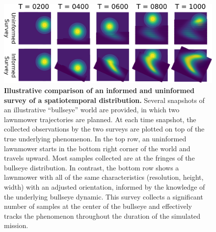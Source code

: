 \begin{figure}[h!]
  \centering
  \includegraphics[width=1\columnwidth]{figures/intro_lawn.png}
  \caption[Comparison of informed and uninformed survey of spatiotemporal distribution.]{\textbf{Illustrative comparison of an informed and uninformed survey of a spatiotemporal distribution.} Several snapshots of an illustrative ``bullseye'' world are provided, in which two lawnmower trajectories are planned. At each time snapshot, the collected observations by the two surveys are plotted on top of the true underlying phenomenon. In the top row, an uninformed lawnmower starts in the bottom right corner of the world and travels upward.  Most samples collected are at the fringes of the bullseye distribution. In contrast, the bottom row shows a lawnmower with all of the same characteristics (resolution, height, width) with an adjusted orientation, informed by the knowledge of the underlying bullseye dynamic. This survey collects a significant number of samples at the center of the bullseye and effectively tracks the phenomenon throughout the duration of the simulated mission.}
  \label{fig:intro_traj}
\end{figure}

